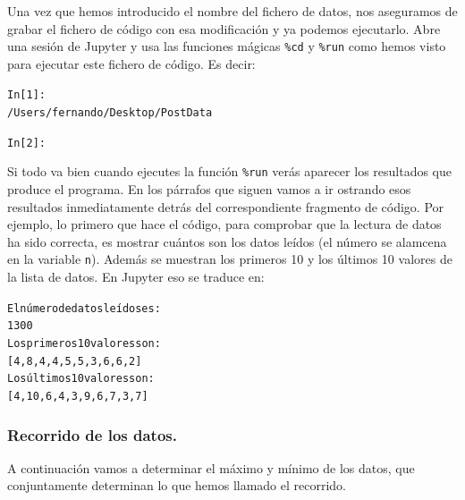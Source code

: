 \documentclass[10pt,a4paper]{article}\usepackage[]{graphicx}\usepackage[]{color}
\makeatletter
\newenvironment{kframe}{%
 \def\at@end@of@kframe{}%
 \ifinner\ifhmode%
  \def\at@end@of@kframe{\end{minipage}}%
  \begin{minipage}{\columnwidth}%
 \fi\fi%
 \def\FrameCommand##1{\hskip\@totalleftmargin \hskip-\fboxsep
 \colorbox{shadecolor}{##1}\hskip-\fboxsep
     \hskip-\linewidth \hskip-\@totalleftmargin \hskip\columnwidth}%
 \MakeFramed {\advance\hsize-\width
   \@totalleftmargin\z@ \linewidth\hsize
   \@setminipage}}%
 {\par\unskip\endMakeFramed%
 \at@end@of@kframe}
\newenvironment{knitrout}{}{} %
\newcounter {cont01}
\makeatother
\begin{document}
Una vez que hemos introducido el nombre del fichero de datos, nos aseguramos de grabar el fichero de código con esa modificación y ya podemos ejecutarlo. Abre una sesión de Jupyter y usa las funciones mágicas \verb&%cd&
y \verb&%run&
como hemos visto para ejecutar este fichero de código. Es decir:
\begin{knitrout}
\color{fgcolor}\begin{kframe}
\begin{alltt}
In [1]: %
/Users/fernando/Desktop/PostData

In [2]: %
\end{alltt}
\end{kframe}
\end{knitrout}
Si todo va bien cuando ejecutes la función \verb&%run&
verás aparecer los resultados que produce el programa. En los párrafos que siguen vamos a ir ostrando esos resultados inmediatamente detrás del correspondiente fragmento de código. Por ejemplo, lo primero que hace el código, para comprobar que la lectura de datos ha sido correcta, es mostrar cuántos son los datos leídos (el número se alamcena en la variable {\tt n}). Además se muestran los primeros 10 y los últimos 10 valores de la lista de datos. En Jupyter eso se traduce en:
\begin{knitrout}
\color{fgcolor}\begin{kframe}
\begin{alltt}
El número de datos leídos es:
1300
Los primeros 10 valores son:
[4, 8, 4, 4, 5, 5, 3, 6, 6, 2]
Los últimos 10 valores son:
[4, 10, 6, 4, 3, 9, 6, 7, 3, 7]
\end{alltt}
\end{kframe}
\end{knitrout}

\subsubsection*{Recorrido de los datos.}
\label{tut02:subsubsec:recorridoDatos}

A continuación vamos a determinar el máximo y mínimo de los datos, que conjuntamente determinan lo que hemos llamado el recorrido.
\end{document}
